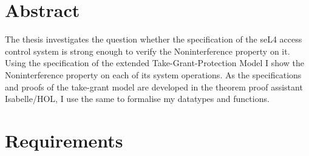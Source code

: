 \documentclass[11pt,a4paper,twoside,BCOR=20mm]{article}
\begin{document}
	
\deckblatt
	
	
\declaration
{}

\clearpage
\section*{Abstract}
	
The thesis investigates the question whether the specification of the seL4 access control system is strong enough to verify the Noninterference property on it. 
Using the specification of the extended Take-Grant-Protection Model \cite{TakeG} I show the Noninterference property \cite{InfFlow} on each of its system operations. 
As the specifications and proofs of the take-grant model are developed in the theorem proof assistant Isabelle/HOL, I use the same to formalise my datatypes and functions. 
	

\newpage
\listoffigures
\newpage
\tableofcontents

	
\clearpage

	 
\newpage
\section{Requirements}

\newpage

\clearpage

\newpage
 
\newpage

\newpage

\newpage

\newpage
\end{document}
